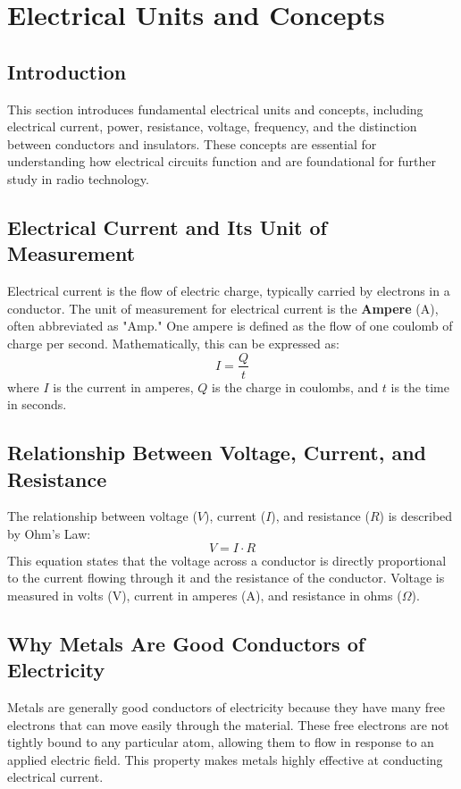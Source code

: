 \section{Electrical Units and Concepts}
\label{section:electrical_units_and_concepts}

\subsection*{Introduction}
This section introduces fundamental electrical units and concepts, including electrical current, power, resistance, voltage, frequency, and the distinction between conductors and insulators. These concepts are essential for understanding how electrical circuits function and are foundational for further study in radio technology.

\subsection*{Electrical Current and Its Unit of Measurement}
Electrical current is the flow of electric charge, typically carried by electrons in a conductor. The unit of measurement for electrical current is the \textbf{Ampere} (A), often abbreviated as "Amp." One ampere is defined as the flow of one coulomb of charge per second. Mathematically, this can be expressed as:
\begin{equation}
I = \frac{Q}{t}
\end{equation}
where \( I \) is the current in amperes, \( Q \) is the charge in coulombs, and \( t \) is the time in seconds.

\subsection*{Relationship Between Voltage, Current, and Resistance}
The relationship between voltage (\( V \)), current (\( I \)), and resistance (\( R \)) is described by Ohm's Law:
\begin{equation}
V = I \cdot R
\end{equation}
This equation states that the voltage across a conductor is directly proportional to the current flowing through it and the resistance of the conductor. Voltage is measured in volts (V), current in amperes (A), and resistance in ohms (\(\Omega\)).

\subsection*{Why Metals Are Good Conductors of Electricity}
Metals are generally good conductors of electricity because they have many free electrons that can move easily through the material. These free electrons are not tightly bound to any particular atom, allowing them to flow in response to an applied electric field. This property makes metals highly effective at conducting electrical current.

